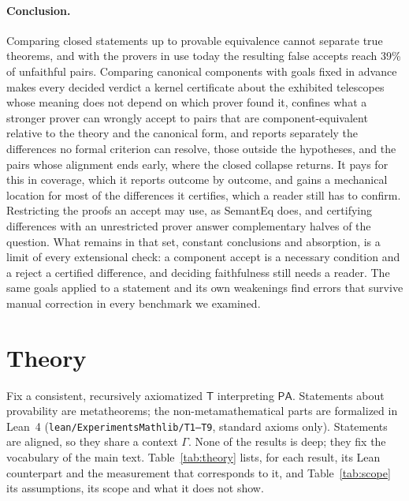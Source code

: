 \documentclass[10pt]{article}
\theoremstyle{definition}
\newcommand{\T}{\mathsf{T}}
\begin{document}
\paragraph{Conclusion.} Comparing closed statements up to provable equivalence cannot separate
true theorems, and with the provers in use today the resulting false accepts reach 39\% of
unfaithful pairs. Comparing canonical components with goals fixed in advance makes every
decided verdict a kernel certificate about the exhibited telescopes whose meaning does not depend
on which prover found it, confines what a stronger prover can wrongly accept to pairs that are
component-equivalent relative to the theory and the canonical form, and reports separately the
differences no formal criterion can resolve, those outside the hypotheses, and the pairs whose
alignment ends early, where the closed collapse returns. It pays for this in coverage, which it
reports outcome by outcome, and gains a mechanical location for most of the differences it
certifies, which a reader still has to confirm. Restricting the proofs an accept may use, as
SemantEq does, and certifying differences with an unrestricted prover answer complementary
halves of the question. What remains in that set, constant conclusions and absorption, is a limit of every
extensional check: a component accept is a necessary condition and a reject a certified
difference, and deciding faithfulness still needs a reader. The same goals applied to a statement and its own
weakenings find errors that survive manual correction in every benchmark we examined.

\appendix
\section{Theory}\label{app:theory}

Fix a consistent, recursively axiomatized $\T$ interpreting $\mathsf{PA}$. Statements about
provability are metatheorems; the non-metamathematical parts are formalized in Lean~4
(\texttt{lean/ExperimentsMathlib/T1--T9}, standard axioms only). Statements are aligned, so they
share a context $\Gamma$. None of the results is deep; they fix the vocabulary of the main text.
Table~\ref{tab:theory} lists, for each result, its Lean counterpart and the measurement that
corresponds to it, and Table~\ref{tab:scope} its assumptions, its scope and what it does not
show.
\end{document}
